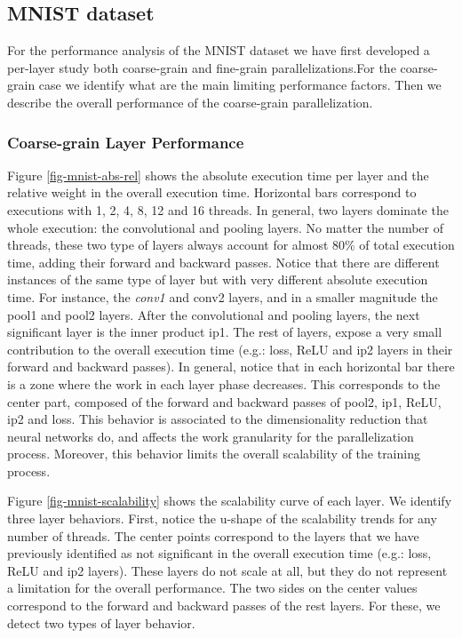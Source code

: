 \subsection{MNIST dataset}
For the performance analysis of the MNIST dataset we have first 
developed a per-layer study both coarse-grain and fine-grain parallelizations.For the coarse-grain case we identify what are the main limiting 
performance factors. Then we describe the overall performance of the 
coarse-grain parallelization. 

\subsubsection{Coarse-grain Layer Performance}
Figure \ref{fig-mnist-abs-rel} shows the absolute execution time per layer 
and the relative weight in the overall execution time. Horizontal bars 
correspond to executions with 1, 2, 4, 8, 12 and 16 threads. In general, 
two layers dominate the whole execution: the convolutional and pooling 
layers. No matter the number of threads, these two type of layers always 
account for almost 80\% of total execution time, adding their forward 
and backward passes. Notice that there are different instances of the 
same type of layer but with very different absolute execution time. 
For instance, the \emph{conv1} and conv2 layers, and in a smaller magnitude 
the pool1 and pool2 layers. After the convolutional and pooling layers, 
the next significant layer is the inner product ip1. The rest of layers, 
expose a very small contribution to the overall execution time 
(e.g.: loss, ReLU and ip2 layers in their forward and backward passes).
In general, notice that in each horizontal bar there is a zone where the 
work in each layer phase decreases. This corresponds to the center part, 
composed of the forward and backward passes of pool2, ip1, ReLU, ip2 and loss.
This behavior is associated to the dimensionality reduction that neural 
networks do, and affects the work granularity for the parallelization process.
Moreover, this behavior limits the overall scalability of the training process.

Figure \ref{fig-mnist-scalability} shows the scalability curve of each layer. 
We identify three layer behaviors. First, notice the u-shape of the 
scalability trends for any number of threads. The center points 
correspond to the layers that we have previously identified as not 
significant in the overall execution time (e.g.: loss, ReLU and ip2 layers). 
These layers do not scale at all, but they do not represent a limitation for 
the overall performance. The two sides on the center values correspond 
to the forward and backward passes of the rest layers. For these, we detect 
two types of layer behavior. 

